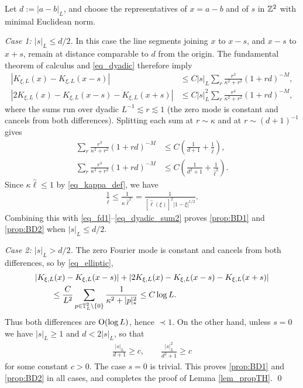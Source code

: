 Let $d:=|a-b|_{L}$, and choose the representatives of $x=a-b$ and of $s$ in $\mathbb{Z}^{2}$ with minimal Euclidean norm.

\medskip
\noindent\emph{Case 1: $|s|_{L}\leq d/2$.} In this case the line segments joining $x$ to $x-s$, and $x-s$ to $x+s$, remain at distance comparable to $d$ from the origin. The fundamental theorem of calculus and \eqref{eq_dyadic} therefore imply
%
\begin{align}
|K_{\xi,L}(x)-K_{\xi,L}(x-s)|&\leq C|s|_{L}\sum_{r}\frac{r^{3}}{\kappa^{2}+r^{2}}(1+rd)^{-M},\label{eq_fd1}\\
|2K_{\xi,L}(x)-K_{\xi,L}(x-s)-K_{\xi,L}(x+s)|&\leq C|s|_{L}^{2}\sum_{r}\frac{r^{4}}{\kappa^{2}+r^{2}}(1+rd)^{-M},\label{eq_fd2}
\end{align}
%
where the sums run over dyadic $L^{-1}\lesssim r\lesssim1$ (the zero mode is constant and cancels from both differences). Splitting each sum at $r\sim\kappa$ and at $r\sim(d+1)^{-1}$ gives
%
\begin{align}
\sum_{r}\frac{r^{3}}{\kappa^{2}+r^{2}}(1+rd)^{-M}&\leq C\left(\frac{1}{d+1}+\frac{1}{\hat\ell}\right),\label{eq_dyadic_sum1}\\
\sum_{r}\frac{r^{4}}{\kappa^{2}+r^{2}}(1+rd)^{-M}&\leq C\left(\frac{1}{d^{2}+1}+\frac{1}{\hat\ell^{2}}\right).\label{eq_dyadic_sum2}
\end{align}
%
Since $\kappa\hat\ell\leq1$ by \eqref{eq_kappa_def}, we have
%
\begin{align*}
\frac{1}{\hat\ell}\leq\frac{1}{\kappa\hat\ell^{2}}=\frac{1}{[\hat\ell(\xi)]^{2}|1-\xi|^{1/2}}.
\end{align*}
%
Combining this with \eqref{eq_fd1}--\eqref{eq_dyadic_sum2} proves \eqref{prop:BD1} and \eqref{prop:BD2} when $|s|_{L}\leq d/2$.

\medskip
\noindent\emph{Case 2: $|s|_{L}>d/2$.} The zero Fourier mode is constant and cancels from both differences, so by \eqref{eq_elliptic},
%
\begin{align*}
&|K_{\xi,L}(x)-K_{\xi,L}(x-s)|+|2K_{\xi,L}(x)-K_{\xi,L}(x-s)-K_{\xi,L}(x+s)|\\
&\qquad\leq\frac{C}{L^{2}}\sum_{p\in\mathbb T_{L}^{2}\setminus\{0\}}\frac{1}{\kappa^{2}+|p|_{*}^{2}}\leq C\log L.
\end{align*}
%
Thus both differences are $\operatorname{O}(\log L)$, hence $\prec1$. On the other hand, unless $s=0$ we have $|s|_{L}\geq1$ and $d<2|s|_{L}$, so that
%
\begin{align*}
\frac{|s|_{L}}{d+1}\geq c,\qquad \frac{|s|_{L}^{2}}{d^{2}+1}\geq c
\end{align*}
%
for some constant $c>0$. The case $s=0$ is trivial. This proves \eqref{prop:BD1} and \eqref{prop:BD2} in all cases, and completes the proof of Lemma \ref{lem_propTH}. \qed
